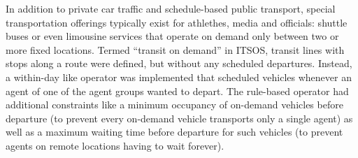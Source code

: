 In addition to private car traffic and schedule-based public transport, special
transportation offerings typically exist for athlethes, media and officials:
shuttle buses or even limousine services that operate on demand only between two
or more fixed locations. Termed ``transit on demand'' in ITSOS, transit lines
with stops along a route were defined, but without any scheduled departures. 
Instead, a within-day like operator was implemented that scheduled vehicles
whenever an agent of one of the agent groups wanted to depart. The
rule-based operator had additional constraints like a minimum occupancy of
on-demand vehicles before departure (to prevent every on-demand vehicle
transports only a single agent) as well as a maximum waiting time before
departure for such vehicles (to prevent agents on remote locations having to
wait forever).

